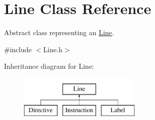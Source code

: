 \hypertarget{class_line}{\section{Line Class Reference}
\label{class_line}
}


Abstract class representing an \hyperlink{class_line}{Line}.  




{\ttfamily \#include $<$Line.\+h$>$}

Inheritance diagram for Line\+:\begin{figure}[H]
\begin{center}
\leavevmode
\includegraphics[height=2.000000cm]{class_line}
\end{center}
\end{figure}
